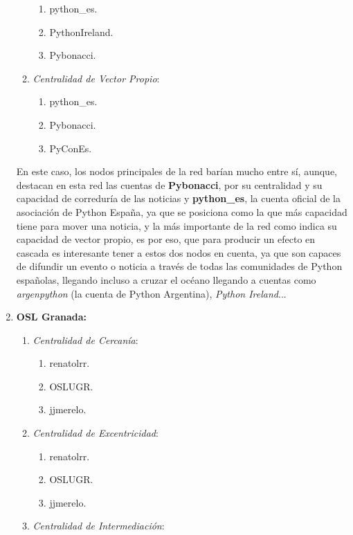\documentclass[paper=a4, fontsize=11pt]{article} %
\numberwithin{equation}{section} %
\numberwithin{figure}{section} %
\numberwithin{table}{section} %
\begin{document}
\begin{enumerate}[$\bullet$]
\begin{enumerate}[---]
    \begin{enumerate}
      \item python\_es.
      \item PythonIreland.
      \item Pybonacci.
    \end{enumerate}
    \item \textit{Centralidad de Vector Propio}:
    \begin{enumerate}
      \item python\_es.
      \item Pybonacci.
      \item PyConEs.
    \end{enumerate}
  \end{enumerate}
  En este caso, los nodos principales de la red barían mucho entre sí, aunque, destacan en esta red las cuentas de \textbf{Pybonacci}, por su centralidad y su capacidad de correduría de las noticias y \textbf{python\_es}, la cuenta oficial de la asociación de Python España, ya que se posiciona como la que más capacidad tiene para mover una noticia, y la más importante de la red como indica su capacidad de vector propio, es por eso, que para producir un efecto en cascada es interesante tener a estos dos nodos en cuenta, ya que son capaces de difundir un evento o noticia a través de todas las comunidades de Python españolas, llegando incluso a cruzar el océano llegando a cuentas como \textit{argenpython} (la cuenta de Python Argentina), \textit{Python Ireland}...
  \item \textbf{OSL Granada:}
  \begin{enumerate}[---]
    \item \textit{Centralidad de Cercanía}:
    \begin{enumerate}
      \item renatolrr.
      \item OSLUGR.
      \item jjmerelo.
    \end{enumerate}
    \item \textit{Centralidad de Excentricidad}:
    \begin{enumerate}
      \item renatolrr.
      \item OSLUGR.
      \item jjmerelo.
    \end{enumerate}
    \item \textit{Centralidad de Intermediación}:
    \begin{enumerate}

\end{enumerate}
\end{enumerate}
\end{enumerate}
\end{document}
